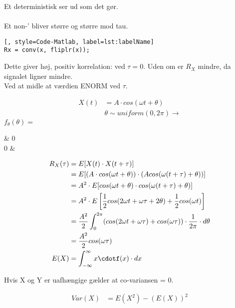 \documentclass[Main]{subfiles}
\begin{document}
\begin{theo}
Et deterministisk ser ud som det gør.
\\
\\
Et non-' bliver større og større mod tau.
\begin{lstlisting}[, style=Code-Matlab, label=lst:labelName]
Rx = conv(x, fliplr(x));
\end{lstlisting}
Dette giver høj, positiv korrelation: ved $\tau = 0$. 
Uden om er $R_X$ mindre, da signalet ligner mindre.
\\
Ved at midle at værdien ENORM ved $\tau$.
\end{theo}

\begin{theo}[Eksempel]
\begin{align*}
X(t) &= A \cdot cos(\omega t + \theta)\\
	& \theta \sim uniform(0, 2 \pi) \rightarrow
\end{align*}
$f_\theta (\theta) =$
\begin{FunArg} 
 & 0 \leq \theta {}\pi \\
0 & 
\end{FunArg}

\begin{align*}
R_X(\tau) &= E[X(t) \cdot X(t+\tau)] \\
	&= E[(A \cdot cos(\omega t+\theta)) \cdot (A cos(\omega (t+\tau) + \theta))] \\
	&= A^2 \cdot E[cos( \omega t+ \theta) \cdot cos(\omega (t+\tau)+\theta)] \\
	&= A^2 \cdot E\left[\frac{1}{2} cos(2\omega t+\omega \tau + 2 \theta) + \frac{1}{2} cos( \omega t)\right] \\
	&= \dfrac{A^2}{2} \int_0^{2 \pi} (cos (2 \omega t + \omega \tau) + cos(\omega \tau)) \cdot \dfrac{1}{2 \pi} \cdot d\theta \\
	&= \dfrac{A^2}{2} cos( \omega \tau) \\
E(X) &= \int_{-\infty}^\infty x \cdotf(x) \cdot dx
\end{align*}

\end{theo}

Hvis X og Y er uafhængige gælder at co-variansen = 0.
\begin{theo}[Regneregler]
\begin{align*}
Var(X) &= E(X^2)- (E(X))^2 \\
\end{align*}
\end{theo}




\end{document}
